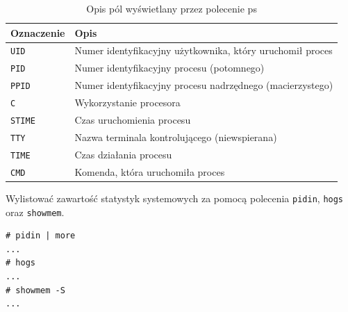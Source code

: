 \begin{example}
\begin{table}[h!]
\centering
\caption{Opis pól wyświetlany przez polecenie ps}
\setlength{\arrayrulewidth}{1pt}
\setlength{\tabcolsep}{6pt}
\renewcommand{\arraystretch}{1.2}
\begin{tabular}{ |p{}|p{}|}
\hline \rowcolor{gray}
\textbf{Oznaczenie} & \textbf{Opis} \\ \hline
\mbox{\lstinline[style=MyBashStyle]{UID}} & Numer identyfikacyjny użytkownika, który uruchomił proces \\ \hline
\mbox{\lstinline[style=MyBashStyle]{PID}} & Numer identyfikacyjny procesu (potomnego) \\ \hline
\mbox{\lstinline[style=MyBashStyle]{PPID}}  & Numer identyfikacyjny procesu nadrzędnego (macierzystego) \\ \hline
\mbox{\lstinline[style=MyBashStyle]{C}}  & Wykorzystanie procesora \\ \hline
\mbox{\lstinline[style=MyBashStyle]{STIME}}  & Czas uruchomienia procesu \\ \hline
\mbox{\lstinline[style=MyBashStyle]{TTY}}  & Nazwa terminala kontrolującego (niewspierana) \\ \hline
\mbox{\lstinline[style=MyBashStyle]{TIME}}  & Czas działania procesu \\ \hline
\mbox{\lstinline[style=MyBashStyle]{CMD}}  & Komenda, która uruchomiła proces \\ \hline
\end{tabular}
\label{tab:opispol}
\end{table}

Wylistować zawartość statystyk systemowych za pomocą polecenia \lstinline[style=MyBashStyle]{pidin}, \lstinline[style=MyBashStyle]{hogs} oraz \lstinline[style=MyBashStyle]{showmem}.

\begin{lstlisting}[style=MyBashStyle,deletekeywords={ps}]
# pidin | more
...
# hogs
...
# showmem -S
...
\end{lstlisting}

\end{example}


